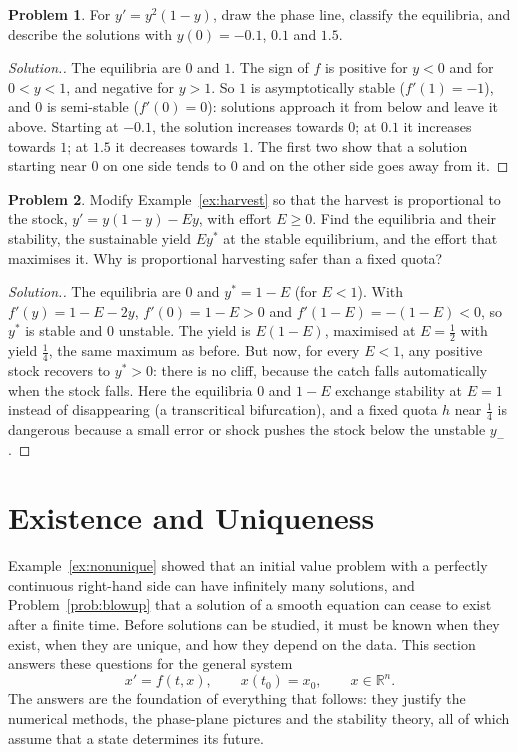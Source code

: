 \documentclass[11pt,a4paper]{article}
\numberwithin{equation}{section}
\theoremstyle{definition}
\newtheorem{problemx}{Problem}[subsection]
\newenvironment{problem}{\begin{problemx}}{\end{problemx}}
\newenvironment{solution}
  {\renewcommand{\qedsymbol}{}\begin{proof}[\textit{Solution}.]}
  {\end{proof}}
\begin{document}
\begin{problem}
For $y' = y^2(1 - y)$, draw the phase line, classify the equilibria, and describe the solutions with $y(0) = -0.1$, $0.1$ and $1.5$.
\end{problem}

\begin{solution}
The equilibria are $0$ and $1$. The sign of $f$ is positive for $y < 0$ and for $0 < y < 1$, and negative for $y > 1$. So $1$ is asymptotically stable ($f'(1) = -1$), and $0$ is
semi-stable ($f'(0) = 0$): solutions approach it from below and leave it above. Starting at $-0.1$, the solution increases towards $0$; at $0.1$ it increases towards $1$; at
$1.5$ it decreases towards $1$. The first two show that a solution starting near $0$ on one side tends to $0$ and on the other side goes away from it.
\end{solution}

\begin{problem}
\label{prob:harvestprop}
Modify Example~\ref{ex:harvest} so that the harvest is proportional to the stock, $y' = y(1 - y) - Ey$, with effort $E \geq 0$. Find the equilibria and their stability,
the sustainable yield $Ey^*$ at the stable equilibrium, and the effort that maximises it. Why is proportional harvesting safer than a fixed quota?
\end{problem}

\begin{solution}
The equilibria are $0$ and $y^* = 1 - E$ (for $E < 1$). With $f'(y) = 1 - E - 2y$, $f'(0) = 1 - E > 0$ and $f'(1 - E) = -(1 - E) < 0$, so $y^*$ is stable and $0$ unstable. The yield is
$E(1 - E)$, maximised at $E = \frac12$ with yield $\frac14$, the same maximum as before. But now, for every $E < 1$, any positive stock recovers to $y^* > 0$: there is no cliff,
because the catch falls automatically when the stock falls. Here the equilibria $0$ and $1 - E$ exchange stability at $E = 1$ instead of disappearing (a transcritical
bifurcation), and a fixed quota $h$ near $\frac14$ is dangerous because a small error or shock pushes the stock below the unstable $y_-$.
\end{solution}

\section{Existence and Uniqueness}
\label{sec:exist}

Example~\ref{ex:nonunique} showed that an initial value problem with a perfectly continuous right-hand side can have infinitely many solutions, and
Problem~\ref{prob:blowup} that a solution of a smooth equation can cease to exist after a finite time. Before solutions can be studied, it must be known when they
exist, when they are unique, and how they depend on the data. This section answers these questions for the general system
\[
x' = f(t, x), \qquad x(t_0) = x_0, \qquad x \in \mathbb R^n .
\]
The answers are the foundation of everything that follows: they justify the numerical methods, the phase-plane pictures and the stability theory,
all of which assume that a state determines its future.
\end{document}
